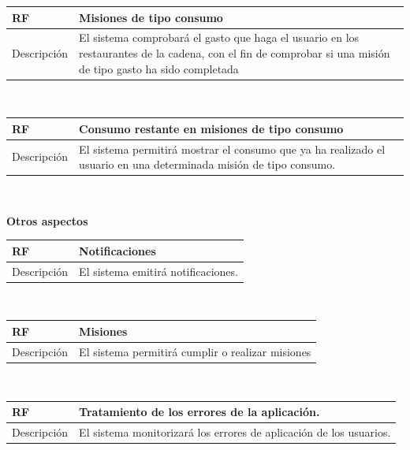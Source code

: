 \documentclass[twoside]{report}
\newcommand\addrow[2]{#1 &#2\\ }
\newcommand\addheading[2]{#1 &#2\\ \hline}
\newcommand\tabularhead{\begin{tabular}{lp{0.7\textwidth}}
\hline
}
\newenvironment{req}{\tabularhead}
{\hline\end{tabular}}
\begin{document}
\vspace{0.25cm}

\begin{req}
	\addheading{\textbf{RF\arabic{functionalRequirements}}}{Misiones de tipo consumo}
	\addrow{Descripción}{El sistema comprobará el gasto que haga el usuario en los restaurantes de la cadena, con el fin de comprobar si una misión de tipo gasto ha sido completada}
\end{req}\\

\vspace{0.25cm}

\begin{req}
	\addheading{\textbf{RF\arabic{functionalRequirements}}}{Consumo restante en misiones de tipo consumo}
	\addrow{Descripción}{El sistema permitirá mostrar el consumo que ya ha realizado el usuario en una determinada misión de tipo consumo.}
\end{req}\\

\vspace{1cm}

\textbf{Otros aspectos}\\

\begin{req}
	\addheading{\textbf{RF\arabic{functionalRequirements}}}{Notificaciones}
	\addrow{Descripción}{El sistema emitirá notificaciones.}
\end{req}\\

\vspace{0.25cm}

\begin{req}
	\addheading{\textbf{RF\arabic{functionalRequirements}}}{Misiones}
	\addrow{Descripción}{El sistema permitirá cumplir o realizar misiones}
\end{req}\\

\vspace{0.25cm}

\begin{req}
	\addheading{\textbf{RF\arabic{functionalRequirements}}}{Tratamiento de los errores de la aplicación.}
	\addrow{Descripción}{El sistema monitorizará los errores de aplicación de los usuarios.}
\end{req}\\
\end{document}
